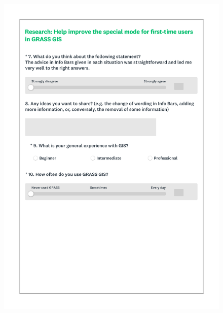 \documentclass[a4paper,10pt,twoside]{article}
\begin{document}
 \newpage
 \begin{figure}[hbt!]
 \begin{center}
 \includegraphics[width=16cm]{../surveys/questionnaires/survey2-page6_questions7_8.pdf}
 \end{center}
 \end{figure}
 
\end{document}
